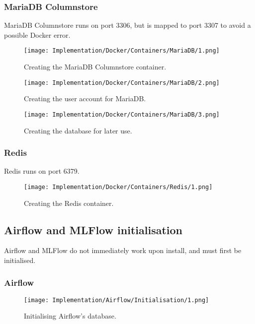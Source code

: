 \pagebreak 
\subsubsection{MariaDB Columnstore}
MariaDB Columnstore runs on port 3306, but is mapped to port 3307 to avoid a possible Docker error.

\begin{figure}[H]
    \centering
    \texttt{[image: Implementation/Docker/Containers/MariaDB/1.png]}
    \caption{Creating the MariaDB Columnstore container.}
    \label{fig:CreateMCS}
\end{figure}

\begin{figure}[H]
    \centering
    \texttt{[image: Implementation/Docker/Containers/MariaDB/2.png]}
    \caption{Creating the user account for MariaDB.}
    \label{fig:CreateMCSUser}
\end{figure}

\begin{figure}[H]
    \centering
    \texttt{[image: Implementation/Docker/Containers/MariaDB/3.png]}
    \caption{Creating the database for later use.}
    \label{fig:CreateDB}
\end{figure}

\pagebreak 
\subsubsection{Redis}
Redis runs on port 6379.

\begin{figure}[H]
    \centering
    \texttt{[image: Implementation/Docker/Containers/Redis/1.png]}
    \caption{Creating the Redis container.}
    \label{fig:CreateRedis}
\end{figure}


\subsection{Airflow and MLFlow initialisation}
Airflow and MLFlow do not immediately work upon install, and must first be initialised.

\subsubsection{Airflow}
\begin{figure}[H]
    \centering
    \texttt{[image: Implementation/Airflow/Initialisation/1.png]}
    \caption{Initialising Airflow's database.}
    \label{fig:AirflowInit}
\end{figure}

